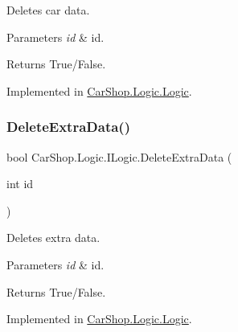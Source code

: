 Deletes car data. 


\begin{DoxyParams}{Parameters}
{\em id} & id.\\
\hline
\end{DoxyParams}
\begin{DoxyReturn}{Returns}
True/\+False.
\end{DoxyReturn}


Implemented in \mbox{\hyperlink{class_car_shop_1_1_logic_1_1_logic_ad5164bc7532cb15395d83f6d22b9b816}{Car\+Shop.\+Logic.\+Logic}}.

\mbox{\label{interface_car_shop_1_1_logic_1_1_i_logic_a224a696141bf86a3f16c8ef9d5d4832b}} 
\subsubsection{\texorpdfstring{Delete\+Extra\+Data()}{DeleteExtraData()}}
{\footnotesize\ttfamily bool Car\+Shop.\+Logic.\+I\+Logic.\+Delete\+Extra\+Data (\begin{DoxyParamCaption}\item[{int}]{id }\end{DoxyParamCaption})}



Deletes extra data. 


\begin{DoxyParams}{Parameters}
{\em id} & id.\\
\hline
\end{DoxyParams}
\begin{DoxyReturn}{Returns}
True/\+False.
\end{DoxyReturn}


Implemented in \mbox{\hyperlink{class_car_shop_1_1_logic_1_1_logic_ac032e87056e5879f8308bc028577dce3}{Car\+Shop.\+Logic.\+Logic}}.

\mbox{\label{interface_car_shop_1_1_logic_1_1_i_logic_aee2a118a9a867dbc77901298cf112e02}} 
